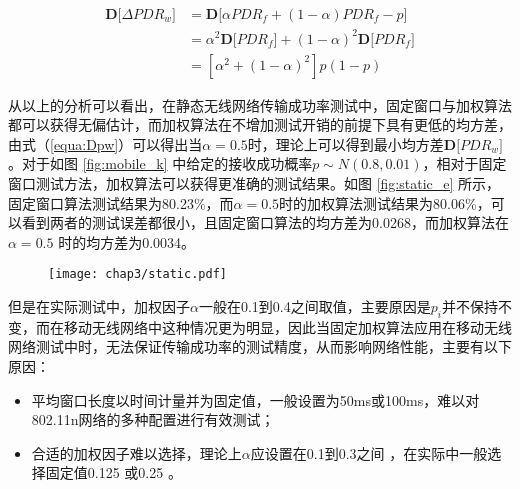 \begin{equation}
\begin{split}
 \textbf{D[}\Delta PDR_w\textbf{]}&=\textbf{D[}\alpha PDR_f+(1-\alpha)PDR_f-p\textbf{]}\\
         &=\alpha^2\textbf{D[}PDR_f\textbf{]}+(1-\alpha)^2\textbf{D[}PDR_f\textbf{]}\\
         &=[\alpha^2+(1-\alpha)^2]p(1-p)
\end{split}
\label{equa:Dpw}
\end{equation}

从以上的分析可以看出，在静态无线网络传输成功率测试中，固定窗口与加权算法都可以获得无偏估计，而加权算法在不增加测试开销的前提下具有更低的均方差，由式（\ref{equa:Dpw}）可以得出当$\alpha=0.5$时，理论上可以得到最小均方差$\textbf{D[}PDR_w\textbf{]}$。对于如图 \ref{fig:mobile_k} 中给定的接收成功概率$p\sim N(0.8, 0.01)$，相对于固定窗口测试方法，加权算法可以获得更准确的测试结果。如图 \ref{fig:static_e} 所示，固定窗口算法测试结果为80.23\%，而$\alpha=0.5$时的加权算法测试结果为80.06\%，可以看到两者的测试误差都很小，且固定窗口算法的均方差为0.0268，而加权算法在$\alpha=0.5$ 时的均方差为0.0034。

\begin{figure}[!htp]
\centering
{}
    \hspace{1cm}
\end{figure}

\begin{figure}[!htp]
\centering
\texttt{[image: chap3/static.pdf]}
\end{figure}

但是在实际测试中，加权因子$\alpha$一般在0.1到0.4之间取值，主要原因是$p_i$并不保持不变，而在移动无线网络中这种情况更为明显，因此当固定加权算法应用在移动无线网络测试中时，无法保证传输成功率的测试精度，从而影响网络性能，主要有以下原因：

\begin{itemize}
  \item 平均窗口长度以时间计量并为固定值，一般设置为50ms或100ms，难以对802.11n网络的多种配置进行有效测试；
  \item 合适的加权因子难以选择，理论上$\alpha$应设置在0.1到0.3之间 ，在实际中一般选择固定值0.125 或0.25 。
\end{itemize}

